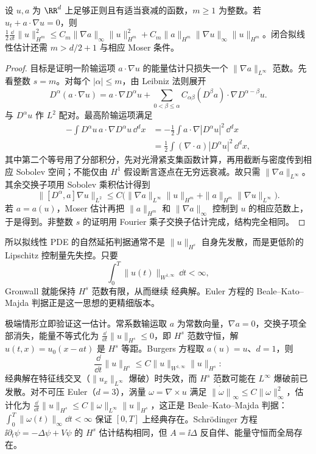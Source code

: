 \begin{proposition}
设 $u,a$ 为 $\RR^d$ 上足够正则且有适当衰减的函数，$m\ge1$ 为整数。若 $u_t+a\cdot\nabla u=0$，则 $\frac12\frac{\dd}{\dd t}\|u\|_{H^m}^2\le C_m\|\nabla a\|_\infty\|u\|_{H^m}^2+C_m\|a\|_{H^m}\|\nabla u\|_\infty\|u\|_{H^m}$。闭合拟线性估计还需 $m>d/2+1$ 与相应 Moser 条件。
\end{proposition}
\begin{proof}
目标是证明一阶输运项 $a\cdot\nabla u$ 的能量估计只损失一个 $\|\nabla a\|_{L^\infty}$ 范数。先看整数 $s=m$。对每个 $|\alpha|\le m$，由 Leibniz 法则展开
\[
D^\alpha(a\cdot\nabla u)
=a\cdot\nabla D^\alpha u
+\sum_{0<\beta\le\alpha}
C_{\alpha\beta}(D^\beta a)\cdot\nabla D^{\alpha-\beta}u.
\]
与 $D^\alpha u$ 作 $L^2$ 配对。最高阶输运项满足
\[
\begin{aligned}
-\int D^\alpha u\,
 a\cdot\nabla D^\alpha u\,\dd^dx
&=-\frac12\int a\cdot\nabla|D^\alpha u|^2\,\dd^dx\\
&=\frac12\int(\nabla\cdot a)|D^\alpha u|^2\,\dd^dx,
\end{aligned}
\]
其中第二个等号用了分部积分，先对光滑紧支集函数计算，再用截断与密度传到相应 Sobolev 空间；不能仅由 $H^1$ 假设断言逐点在无穷远衰减。故只需 $\|\nabla a\|_{L^\infty}$。其余交换子项用 Sobolev 乘积估计得到
\[
\|[D^\alpha,a]\nabla u\|_{L^2}
\le C\bigl(
\|\nabla a\|_{L^\infty}\|u\|_{H^m}
+\|a\|_{H^m}\|\nabla u\|_{L^\infty}
\bigr).
\]
若 $a=a(u)$，Moser 估计再把 $\|a\|_{H^m}$ 和 $\|\nabla a\|_\infty$ 控制到 $u$ 的相应范数上，于是得到。非整数 $s$ 的证明用 Fourier 乘子交换子估计完成，结构完全相同。
\end{proof}

所以拟线性 PDE 的自然延拓判据通常不是 $\|u\|_{H^s}$ 自身先发散，而是更低阶的 Lipschitz 控制量先失控。只要
\[
\int_0^T\|u(t)\|_{W^{1,\infty}}\,\dd t<\infty,
\]
Gronwall 就能保持 $H^s$ 范数有限，从而继续 经典解。Euler 方程的 Beale--Kato--Majda 判据正是这一思想的更精细版本。

极端情形立即验证这一估计。常系数输运取 $a$ 为常数向量，$\nabla a=0$，交换子项全部消失，能量不等式化为 $\frac{\dd}{\dd t}\|u\|_{H^s}\le0$，即 $H^s$ 范数守恒，解 $u(t,x)=u_0(x-at)$ 是 $H^s$ 等距。Burgers 方程取 $a(u)=u$、$d=1$，则
\[
\frac{\dd}{\dd t}\|u\|_{H^s}\le C\|u\|_{W^{1,\infty}}\|u\|_{H^s}:
\]
经典解在特征线交叉（$\|u_x\|_{L^\infty}$ 爆破）时失效，而 $H^s$ 范数可能在 $L^\infty$ 爆破前已发散。对不可压 Euler（$d=3$），涡量 $\omega=\nabla\times u$ 满足 $\dot{\|\omega\|}_\infty\le C\|\omega\|_\infty^2$，估计化为 $\frac{\dd}{\dd t}\|u\|_{H^s}\le C\|\omega\|_{L^\infty}\|u\|_{H^s}$，这正是 Beale--Kato--Majda 判据：$\int_0^T\|\omega(t)\|_\infty\dd t<\infty$ 保证 $[0,T]$ 上经典存在。Schr\"odinger 方程 $\ii\partial_t\psi=-\Delta\psi+V\psi$ 的 $H^s$ 估计结构相同，但 $A=\ii\Delta$ 反自伴、能量守恒而全局存在。

